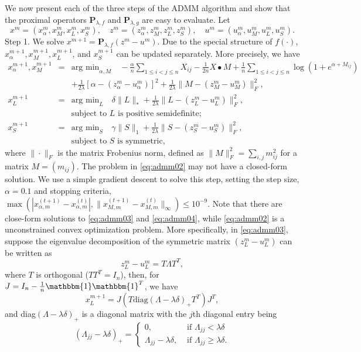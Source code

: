 \documentclass{article}
\begin{document}
We now present each of the three steps of the ADMM algorithm and show that the proximal
operators $\mathbf{P}_{\lambda,f}$ and $\mathbf{P}_{\lambda,g}$ are easy to evaluate.
Let
$$
x^m = (x^m_\alpha, x^m_M, x^m_L, x^m_S), \quad
z^m = (z^m_\alpha, z^m_M, z^m_L, z^m_S), \quad
u^m = (u^m_\alpha, u^m_M, u^m_L, u^m_S).
$$
Step 1. We solve $x^{m+1} = \mathbf{P}_{\lambda,f}(z^m - u^m)$.
Due to the special structure of $f(\cdot)$,
$x^{m+1}_\alpha, x^{m+1}_M, x^{m+1}_L$, and $x^{m+1}_S$
can be updated separately. More precisely, we have
\begin{eqnarray}
x^{m+1}_\alpha, x^{m+1}_M &=& \mbox{arg min}_{\alpha, M} \quad
-\frac{\alpha}{n} \sum_{1\le i< j\le n}X_{ij}
-\frac{1}{2n} X \bullet M
+ \frac{1}{n} \sum_{1\le i<j\le n} \log \left(1 + e^{\alpha + M_{ij}}\right) \nonumber \\
&& + \frac{1}{2\lambda}\left[\alpha - (z^m_\alpha - u^m_\alpha)\right]^2
+ \frac{1}{2\lambda}\|M - (z^m_M - u^m_M)\|^2_F, \label{eq:admm02} \\
x^{m+1}_L &=& \mbox{arg min}_{ L} \quad \delta \|L\|_\ast
+ \frac{1}{2\lambda}\|L - (z^m_L - u^m_L)\|^2_F,\label{eq:admm03}
\\
&& \mbox{subject to $L$ is positive semidefinite;} \nonumber \\
x^{m+1}_S &=& \mbox{arg min}_{ S} \quad  \gamma \|S\|_1
+ \frac{1}{2\lambda}\|S - (z^m_S - u^m_S)\|^2_F,
\label{eq:admm04}
\\
&& \mbox{subject to $S$ is symmetric,} \nonumber
\end{eqnarray}
where $\|\cdot\|_F$ is the matrix Frobenius norm, defined as
$\|M\|^2_F = \sum_{i,j} m^2_{ij}$ for a matrix $M = (m_{ij})$.
The problem in \eqref{eq:admm02} may not have a closed-form solution. We use a simple gradient descent to solve this step, setting the step size, $\alpha=0.1$ and stopping criteria, $\max(|x_{\alpha,m}^{(t+1)}-x_{\alpha,m}^{(t)}|,\|x_{M,m}^{(t+1)}-x_{M,m}^{(t)}\|_{\infty}) \leq 10^{-9}$. Note that there are close-form solutions to \eqref{eq:admm03} and \eqref{eq:admm04}, while \eqref{eq:admm02} is a unconstrained convex optimization problem. More specifically, in \eqref{eq:admm03}, suppose the eigenvalue decomposition of the symmetric matrix $(z^m_L - u^m_L)$ can be written as
$$
z^m_L - u^m_L = T \Lambda T^T,
$$
where $T$ is orthogonal ($T T^T = I_n$), then, for $J=I_{n}-\frac{1}{n}\mathbbm{1}\mathbbm{1}^T$, we have
$$
x^{m+1}_L = J (T \mbox{diag}(\Lambda-\lambda \delta)_+ T^T)J^{T},
$$
and diag$(\Lambda-\lambda \delta)_+$ is a diagonal matrix with the $j$th
diagonal entry being
$$
(\Lambda_{jj}-\lambda \delta)_+ = \left\{
\begin{array}{ll}
0, & \mbox{ if } \Lambda_{jj} < \lambda \delta \\
\Lambda_{jj}-\lambda \delta, & \mbox{ if } \Lambda_{jj} \ge \lambda \delta .
\end{array}
\right.
$$
\end{document}
